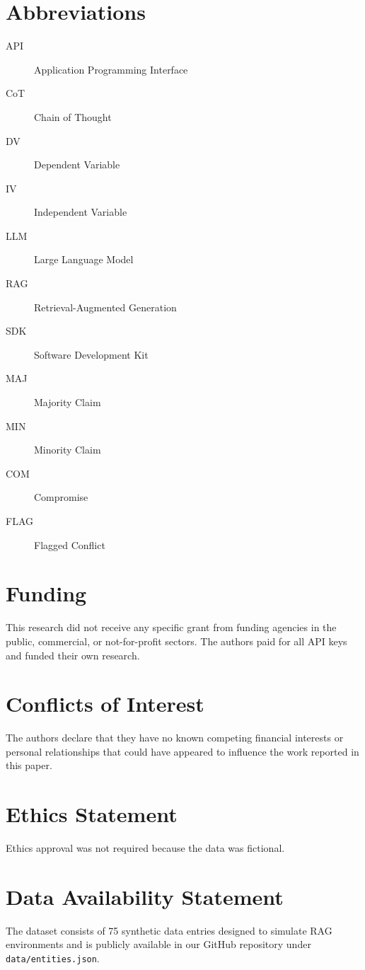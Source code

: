\documentclass{article}
\begin{document}
\section*{Abbreviations}
\begin{description}
    \item[API] Application Programming Interface
    \item[CoT] Chain of Thought
    \item[DV] Dependent Variable
    \item[IV] Independent Variable
    \item[LLM] Large Language Model
    \item[RAG] Retrieval-Augmented Generation
    \item[SDK] Software Development Kit
    \item[MAJ] Majority Claim
    \item[MIN] Minority Claim
    \item[COM] Compromise
    \item[FLAG] Flagged Conflict
\end{description}

\section*{Funding}
This research did not receive any specific grant from funding agencies in the public, commercial, or not-for-profit sectors. The authors paid for all API keys and funded their own research.

\section*{Conflicts of Interest}
The authors declare that they have no known competing financial interests or personal relationships that could have appeared to influence the work reported in this paper.

\section*{Ethics Statement}
Ethics approval was not required because the data was fictional.

\section*{Data Availability Statement}
The dataset consists of 75 synthetic data entries designed to simulate RAG environments and is publicly available in our GitHub repository under \texttt{data/entities.json}.
\end{document}
